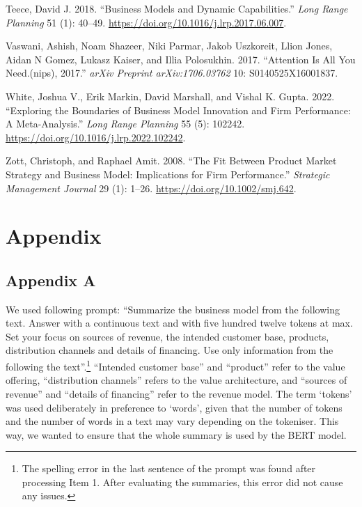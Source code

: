 \documentclass[
]{article}
\newlength{\cslhangindent}
\newenvironment{CSLReferences}[2] %
 {\begin{list}{}{%
  \setlength{\itemindent}{0pt}
  \setlength{\leftmargin}{0pt}
  \setlength{\parsep}{0pt}
  \ifodd #1
   \setlength{\leftmargin}{\cslhangindent}
   \setlength{\itemindent}{-1\cslhangindent}
  \fi
  \setlength{\itemsep}{#2\baselineskip}}}
 {\end{list}}
\begin{document}
\begin{CSLReferences}{1}{0}
Teece, David J. 2018. {``Business Models and Dynamic Capabilities.''}
\emph{Long Range Planning} 51 (1): 40--49.
\url{https://doi.org/10.1016/j.lrp.2017.06.007}.

Vaswani, Ashish, Noam Shazeer, Niki Parmar, Jakob Uszkoreit, Llion
Jones, Aidan N Gomez, Lukasz Kaiser, and Illia Polosukhin. 2017.
{``Attention Is All You Need.(nips), 2017.''} \emph{arXiv Preprint
arXiv:1706.03762} 10: S0140525X16001837.

White, Joshua V., Erik Markin, David Marshall, and Vishal K. Gupta.
2022. {``Exploring the Boundaries of Business Model Innovation and Firm
Performance: {A} Meta-Analysis.''} \emph{Long Range Planning} 55 (5):
102242. \url{https://doi.org/10.1016/j.lrp.2022.102242}.

Zott, Christoph, and Raphael Amit. 2008. {``The Fit Between Product
Market Strategy and Business Model: Implications for Firm
Performance.''} \emph{Strategic Management Journal} 29 (1): 1--26.
\url{https://doi.org/10.1002/smj.642}.

\end{CSLReferences}

\newpage{}

\section{Appendix}\label{appendix}

\subsection{Appendix A}\label{appendix-a}

We used following prompt: ``Summarize the business model from the
following text. Answer with a continuous text and with five hundred
twelve tokens at max. Set your focus on sources of revenue, the intended
customer base, products, distribution channels and details of financing.
Use only information from the following the text''.\footnote{The
  spelling error in the last sentence of the prompt was found after
  processing Item 1. After evaluating the summaries, this error did not
  cause any issues.} ``Intended customer base'' and ``product'' refer to
the value offering, ``distribution channels'' refers to the value
architecture, and ``sources of revenue'' and ``details of financing''
refer to the revenue model. The term `tokens' was used deliberately in
preference to `words', given that the number of tokens and the number of
words in a text may vary depending on the tokeniser. This way, we wanted
to ensure that the whole summary is used by the BERT model.
\end{document}
